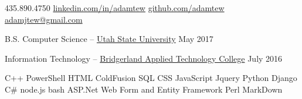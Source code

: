 \documentclass[10pt,letter]{article}
\begin{document}
\sloppy  %

\begin{center}
\end{center}

\spacedhrule{-.5em}{-.5em}

\begin{center}
    435.890.4750\sbull
    \href{http://www.linkedin.com/in/adamtew}{linkedin.com/in/adamtew}\sbull
    \href{http://www.github.com/adamtew}{github.com/adamtew}\sbull
    \noindent\href{mailto:adamjtewatgmail.com}{adamjtew\mbox{}@\mbox{}gmail.com}
\end{center}



\mysection
    {B.S. Computer Science --}
    {\href{https://www.usu.edu/}{Utah State University}}
    {}
    {May 2017}

\vspace{.5em}

\mysection
    {Information Technology --}
    {\href{http://batc.edu/}{Bridgerland Applied Technology College}}
    {}
    {July 2016}

\spacedhrule{1em}{-0.0em}



\vspace{-1.5em}

  \begin{center}
    \item \sbull C++ \sbull PowerShell \sbull HTML \sbull ColdFusion \sbull SQL \sbull CSS \sbull JavaScript \sbull Jquery \sbull Python \sbull  Django \sbull C\# \sbull node.js \sbull bash \sbull ASP.Net Web Form and Entity Framework \sbull Perl \sbull MarkDown \sbull
  \end{center}
\end{document}
